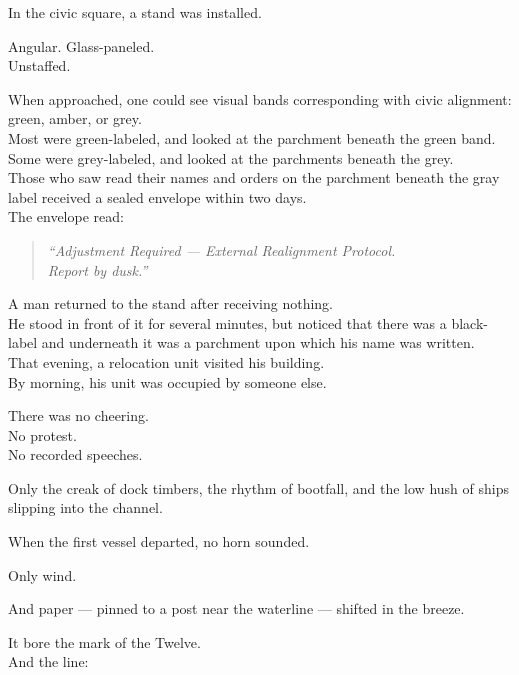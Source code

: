 \documentclass[12pt]{article}
\begin{document}
In the civic square, a stand was installed.

Angular. Glass-paneled.\\
Unstaffed.

When approached, one could see visual bands corresponding with civic alignment: green, amber, or grey.\\
Most were green-labeled, and looked at the parchment beneath the green band.\\
Some were grey-labeled, and looked at the parchments beneath the grey.\\
Those who saw read their names and orders on the parchment beneath the gray label received a sealed envelope within two days.\\
The envelope read:

\begin{quote}
\textit{“Adjustment Required — External Realignment Protocol.\\
Report by dusk.”}
\end{quote}

\vspace{1em}

A man returned to the stand after receiving nothing.\\

He stood in front of it for several minutes, but noticed that there was a black-label and underneath it was a parchment upon which his name was written.\\

That evening, a relocation unit visited his building.\\

By morning, his unit was occupied by someone else.

\vspace{1em}

There was no cheering.\\
No protest.\\
No recorded speeches.

Only the creak of dock timbers, the rhythm of bootfall, and the low hush of ships slipping into the channel.

\vspace{1em}

When the first vessel departed, no horn sounded.

Only wind.

And paper — pinned to a post near the waterline — shifted in the breeze.

It bore the mark of the Twelve.\\
And the line:
\end{document}
